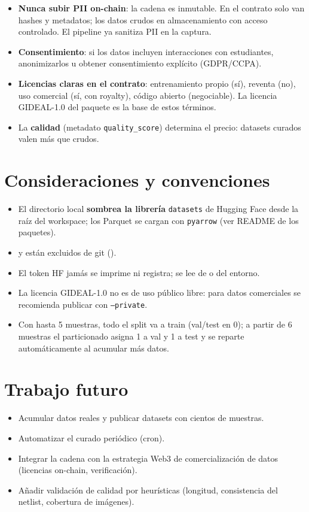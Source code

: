 \documentclass[12pt, a4paper]{article}
\begin{document}
\begin{itemize}
    \item \textbf{Nunca subir PII on-chain}: la cadena es inmutable. En el
    contrato solo van hashes y metadatos; los datos crudos en almacenamiento con
    acceso controlado. El pipeline ya sanitiza PII en la captura.
    \item \textbf{Consentimiento}: si los datos incluyen interacciones con
    estudiantes, anonimizarlos u obtener consentimiento explícito
    (GDPR/CCPA).
    \item \textbf{Licencias claras en el contrato}: entrenamiento propio (sí),
    reventa (no), uso comercial (sí, con royalty), código abierto (negociable).
    La licencia GIDEAL-1.0  del paquete es la base de estos
    términos.
    \item La \textbf{calidad} (metadato \texttt{quality\_score}) determina el
    precio: datasets curados valen más que crudos.
\end{itemize}

\section{Consideraciones y convenciones}

\begin{itemize}
    \item El directorio local  \textbf{sombrea la librería}
    \texttt{datasets} de Hugging Face desde la raíz del workspace; los Parquet se
    cargan con \texttt{pyarrow} (ver README de los paquetes).
    \item {} y  están excluidos de git
    ().
    \item El token HF jamás se imprime ni registra; se lee de  o del
    entorno.
    \item La licencia GIDEAL-1.0 no es de uso público libre: para datos comerciales
    se recomienda publicar con \texttt{--private}.
    \item Con hasta 5 muestras, todo el split va a train (val/test en 0); a partir
    de 6 muestras el particionado asigna 1 a val y 1 a test y se reparte
    automáticamente al acumular más datos.
\end{itemize}

\section{Trabajo futuro}

\begin{itemize}
    \item Acumular datos reales y publicar datasets con cientos de muestras.
    \item Automatizar el curado periódico (cron).
    \item Integrar la cadena con la estrategia Web3 de comercialización de datos
    (licencias on-chain, verificación).
    \item Añadir validación de calidad por heurísticas (longitud, consistencia del
    netlist, cobertura de imágenes).
\end{itemize}
\end{document}
